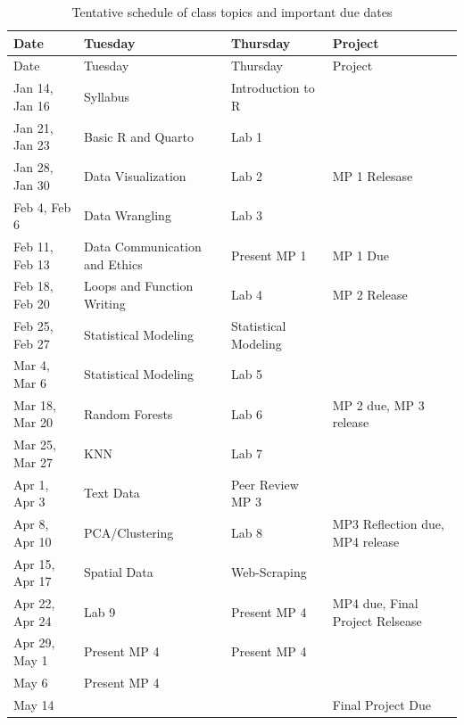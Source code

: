 \documentclass[
  11pt,
  letterpaper,
  DIV=11,
  numbers=noendperiod]{scrartcl}
\begin{document}
\begin{longtable}[]{@{}llll@{}}
\caption{Tentative schedule of class topics and important due
dates}\tabularnewline
\toprule\noalign{}
Date & Tuesday & Thursday & Project \\
\midrule\noalign{}
\endfirsthead
\toprule\noalign{}
Date & Tuesday & Thursday & Project \\
\midrule\noalign{}
\endhead
\bottomrule\noalign{}
\endlastfoot
Jan 14, Jan 16 & Syllabus & Introduction to R & \\
Jan 21, Jan 23 & Basic R and Quarto & Lab 1 & \\
Jan 28, Jan 30 & Data Visualization & Lab 2 & MP 1 Relesase \\
Feb 4, Feb 6 & Data Wrangling & Lab 3 & \\
Feb 11, Feb 13 & Data Communication and Ethics & Present MP 1 & MP 1
Due \\
Feb 18, Feb 20 & Loops and Function Writing & Lab 4 & MP 2 Release \\
Feb 25, Feb 27 & Statistical Modeling & Statistical Modeling & \\
Mar 4, Mar 6 & Statistical Modeling & Lab 5 & \\
Mar 18, Mar 20 & Random Forests & Lab 6 & MP 2 due, MP 3 release \\
Mar 25, Mar 27 & KNN & Lab 7 & \\
Apr 1, Apr 3 & Text Data & Peer Review MP 3 & \\
Apr 8, Apr 10 & PCA/Clustering & Lab 8 & MP3 Reflection due, MP4
release \\
Apr 15, Apr 17 & Spatial Data & Web-Scraping & \\
Apr 22, Apr 24 & Lab 9 & Present MP 4 & MP4 due, Final Project
Relsease \\
Apr 29, May 1 & Present MP 4 & Present MP 4 & \\
May 6 & Present MP 4 & & \\
May 14 & & & Final Project Due \\
\end{longtable}
\end{document}

